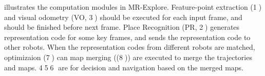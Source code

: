  illustrates the computation modules in MR-Explore. Feature-point extraction (\textcircled{1}) and visual odometry (VO, \textcircled{3}) should be executed for each input frame, and should be finished before next frame. Place Recognition (PR, \textcircled{2}) generates representation code for some key frames, and sends the representation code to other robots. When the  representation codes from different robots are matched, optimizaion (\textcircled{7}) can map merging ((\textcircled{8})) are executed to merge the trajectories and maps. \textcircled{4}\textcircled{5}\textcircled{6} are for decision and navigation based on the merged maps. 